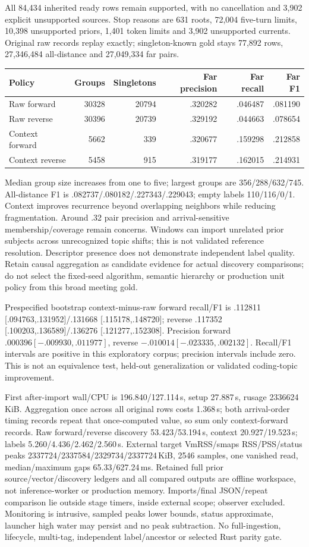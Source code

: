 \documentclass[11pt]{article}
\begin{document}
All 84,434 inherited ready rows remain supported, with no cancellation and 3,902
explicit unsupported sources. Stop reasons are 631 roots, 72,004 five-turn
limits, 10,398 unsupported priors, 1,401 token limits and 3,902 unsupported
currents. Original raw records replay exactly; singleton-known gold stays
77,892 rows, 27,346,484 all-distance and 27,049,334 far pairs.
\begin{center}
\begin{tabular}{lrrrrr}
Policy & Groups & Singletons & Far precision & Far recall & Far F1\\\hline
Raw forward & 30328 & 20794 & .320282 & .046487 & .081190\\
Raw reverse & 30396 & 20739 & .329192 & .044663 & .078654\\
Context forward & 5662 & 339 & .320677 & .159298 & .212858\\
Context reverse & 5458 & 915 & .319177 & .162015 & .214931
\end{tabular}
\end{center}
Median group size increases from one to five; largest groups are
356/288/632/745. All-distance F1 is .082737/.080182/.227343/.229043;
empty labels 110/116/0/1. Context improves recurrence beyond overlapping
neighbors while reducing fragmentation. Around .32 pair precision and
arrival-sensitive membership/coverage remain concerns. Windows can import
unrelated prior subjects across unrecognized topic shifts; this is not validated
reference resolution. Descriptor presence
does not demonstrate independent label quality. Retain causal aggregation as
candidate evidence for actual discovery comparisons; do not select the
fixed-seed algorithm, semantic hierarchy or production unit policy from this
broad meeting gold.

Prespecified bootstrap context-minus-raw forward recall/F1 is
.112811 [.094763,.131952]/.131668 [.115178,.148720]; reverse
.117352 [.100203,.136589]/.136276 [.121277,.152308]. Precision forward
$ .000396 [-.009930,.011977] $, reverse $ -.010014 [-.023335,.002132] $.
Recall/F1 intervals are positive in this exploratory corpus; precision
intervals include zero. This is not an equivalence test, held-out generalization
or validated coding-topic improvement.

First after-import wall/CPU is 196.840/127.114\,s, setup 27.887\,s,
rusage 2336624\,KiB. Aggregation once across all original rows costs 1.368\,s;
both arrival-order timing records repeat that once-computed value, so sum only
context-forward records. Raw forward/reverse discovery 53.423/53.194\,s,
context 20.927/19.523\,s; labels 5.260/4.436/2.462/2.560\,s. External target
VmRSS/smaps RSS/PSS/status peaks 2337724/2337584/2329734/2337724\,KiB,
2546 samples, one vanished read, median/maximum gaps 65.33/627.24\,ms. Retained
full prior source/vector/discovery ledgers and all compared outputs are offline
workspace, not inference-worker or production memory. Imports/final JSON/repeat
comparison lie outside stage timers, inside external scope; observer excluded.
Monitoring is intrusive, sampled peaks lower bounds, status approximate,
launcher high water may persist and no peak subtraction. No full-ingestion,
lifecycle, multi-tag, independent label/ancestor or selected Rust parity gate.
\end{document}
